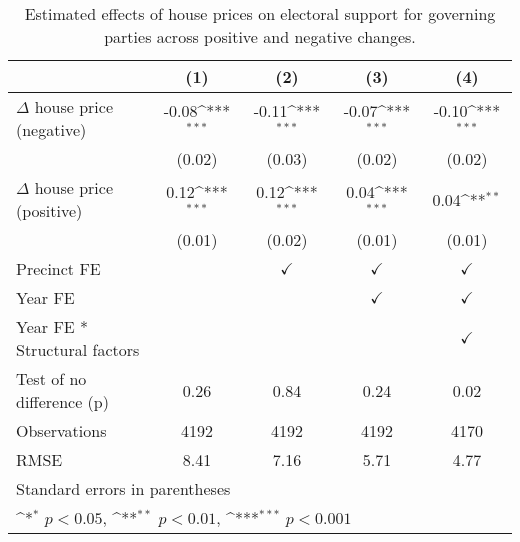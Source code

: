 \begin{table}[htbp]\centering
\def\sym#1{\ifmmode^{#1}\else\(^{#1}\)\fi}
\caption{Estimated effects of house prices on electoral support for governing parties across positive and negative changes.} \label{tab4}
\begin{tabular}{l*{4}{c}}
\hline\hline
                    &\multicolumn{1}{c}{(1)}         &\multicolumn{1}{c}{(2)}         &\multicolumn{1}{c}{(3)}         &\multicolumn{1}{c}{(4)}         \\
\hline
$\Delta$ house price (negative)&       -0.08\sym{***}&       -0.11\sym{***}&       -0.07\sym{***}&       -0.10\sym{***}\\
                    &      (0.02)         &      (0.03)         &      (0.02)         &      (0.02)         \\
[1em]
$\Delta$ house price (positive)&        0.12\sym{***}&        0.12\sym{***}&        0.04\sym{***}&        0.04\sym{**} \\
                    &      (0.01)         &      (0.02)         &      (0.01)         &      (0.01)         \\
[1em]
\hline Precinct  FE &                     &$\checkmark$         &$\checkmark$         &$\checkmark$         \\
[1em]
Year FE             &                     &                     &$\checkmark$         &$\checkmark$         \\
[1em]
Year FE * Structural factors&                     &                     &                     &$\checkmark$         \\
\hline
Test of no difference (p)&        0.26         &        0.84         &        0.24         &        0.02         \\
Observations        &        4192         &        4192         &        4192         &        4170         \\
RMSE                &        8.41         &        7.16         &        5.71         &        4.77         \\
\hline\hline
\multicolumn{5}{l}{\footnotesize Standard errors in parentheses}\\
\multicolumn{5}{l}{\footnotesize \sym{*} \(p<0.05\), \sym{**} \(p<0.01\), \sym{***} \(p<0.001\)}\\
\end{tabular}
\end{table}
